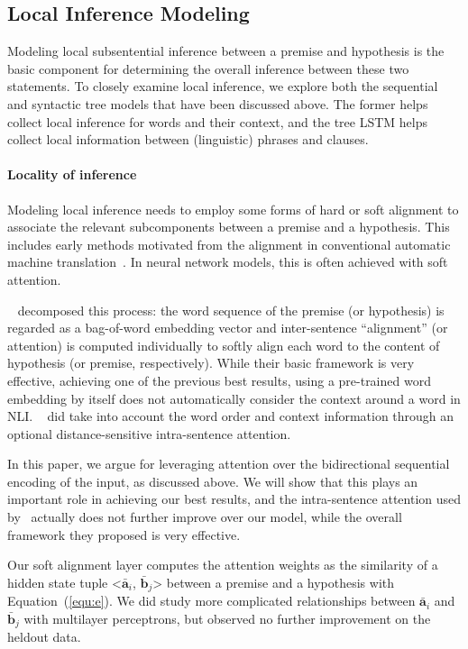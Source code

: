\documentclass[11pt,a4paper]{article}
\newcommand{\vect}[1]{\mathbf{#1}}
\begin{document}
\subsection{Local Inference Modeling}
\label{sec:local}

Modeling local subsentential inference between a premise and hypothesis is the basic component for determining the overall inference between these two statements. 
To closely examine local inference, we explore both the sequential and syntactic tree models that have been discussed above. The former helps collect local inference for words and their context, and the tree LSTM helps collect local information between (linguistic) phrases and clauses. 

\paragraph{Locality of inference}
Modeling local inference needs to employ some forms of hard or soft alignment to associate the relevant subcomponents between a premise and a hypothesis. This includes early methods motivated from the alignment in conventional automatic machine translation~\citep{MacCartneyThesis}. In neural network models, this is often achieved with soft attention. 

~\citet{Parikh:D16-1244} decomposed this process: the word sequence of the premise (or hypothesis) is regarded as a bag-of-word embedding vector and inter-sentence ``alignment'' (or attention) is computed individually to softly align each word to the content of hypothesis (or premise, respectively). While their basic framework is very effective, achieving one of the previous best results, using a pre-trained word embedding by itself does not automatically consider the context around a word in NLI. 
~\citet{Parikh:D16-1244} did take into account the word order and context information through an optional distance-sensitive intra-sentence attention. 

In this paper, we argue for leveraging attention over the bidirectional sequential encoding of the input, as discussed above. We will show that this plays an important role in achieving our best results, and the intra-sentence attention used by~\citet{Parikh:D16-1244} actually does not further improve over our model, while the overall framework they proposed is very effective. 

Our soft alignment layer computes the attention weights as the similarity of a hidden state tuple <$\bar{\vect{a}}_i$, $\bar{\vect{b}}_j$> between a premise and a hypothesis with Equation~(\ref{equ:e}). We did study more complicated relationships between $\bar{\vect{a}}_i$ and $\bar{\vect{b}}_j$ with multilayer perceptrons, but observed no further improvement on the heldout data.
\end{document}
